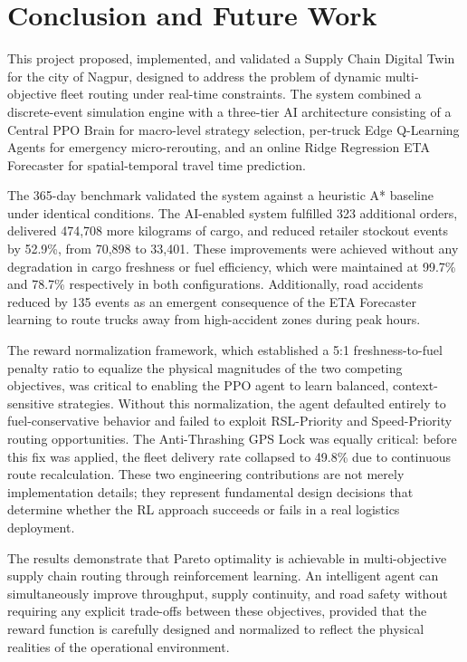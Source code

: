\chapter{Conclusion and Future Work}

This project proposed, implemented, and validated a Supply Chain Digital Twin for
the city of Nagpur, designed to address the problem of dynamic multi-objective
fleet routing under real-time constraints. The system combined a discrete-event
simulation engine with a three-tier AI architecture consisting of a Central PPO
Brain for macro-level strategy selection, per-truck Edge Q-Learning Agents for
emergency micro-rerouting, and an online Ridge Regression ETA Forecaster for
spatial-temporal travel time prediction.

The 365-day benchmark validated the system against a heuristic A* baseline under
identical conditions. The AI-enabled system fulfilled 323 additional orders,
delivered 474,708 more kilograms of cargo, and reduced retailer stockout events by
52.9\%, from 70,898 to 33,401. These improvements were achieved without any
degradation in cargo freshness or fuel efficiency, which were maintained at 99.7\%
and 78.7\% respectively in both configurations. Additionally, road accidents
reduced by 135 events as an emergent consequence of the ETA Forecaster learning
to route trucks away from high-accident zones during peak hours.

The reward normalization framework, which established a 5:1 freshness-to-fuel
penalty ratio to equalize the physical magnitudes of the two competing objectives,
was critical to enabling the PPO agent to learn balanced, context-sensitive
strategies. Without this normalization, the agent defaulted entirely to
fuel-conservative behavior and failed to exploit RSL-Priority and Speed-Priority
routing opportunities. The Anti-Thrashing GPS Lock was equally critical: before
this fix was applied, the fleet delivery rate collapsed to 49.8\% due to
continuous route recalculation. These two engineering contributions are not merely
implementation details; they represent fundamental design decisions that determine
whether the RL approach succeeds or fails in a real logistics deployment.

The results demonstrate that Pareto optimality is achievable in multi-objective
supply chain routing through reinforcement learning. An intelligent agent can
simultaneously improve throughput, supply continuity, and road safety without
requiring any explicit trade-offs between these objectives, provided that the
reward function is carefully designed and normalized to reflect the physical
realities of the operational environment.

